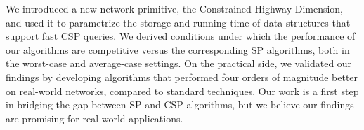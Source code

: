 We introduced a new network primitive, the Constrained Highway Dimension, and used it to parametrize the storage and running time of data structures that support fast CSP queries.
We derived conditions under which the performance of our algorithms are competitive versus the corresponding SP algorithms, both in the worst-case and average-case settings.
On the practical side, we validated our findings by developing algorithms that performed four orders of magnitude better on real-world networks, compared to standard techniques.
Our work is a first step in bridging the gap between SP and CSP algorithms, but we believe our findings are promising for real-world applications.